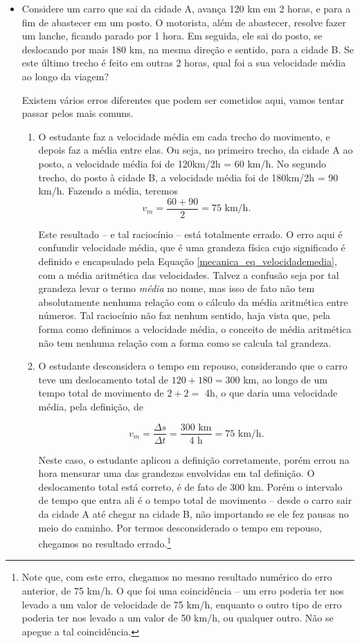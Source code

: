 \begin{itemize}
    O erro aqui, portanto, é considerar a distância, e não o deslocamento escalar, para o cálculo da velocidade média.

    \item [(ii)] Considere um carro que sai da cidade A, avança 120 km em 2 horas, e para a fim de abastecer em um posto. O motorista, além de abastecer, resolve fazer um lanche, ficando parado por 1 hora. Em seguida, ele sai do posto, se deslocando por mais 180 km, na mesma direção e sentido, para a cidade B. Se este último trecho é feito em outras 2 horas, qual foi a sua velocidade média ao longo da viagem?


    Existem vários erros diferentes que podem ser cometidos aqui, vamos tentar passar pelos mais comuns.

    \begin{enumerate}
        \item O estudante faz a velocidade média em cada trecho do movimento, e depois faz a média entre elas. Ou seja, no primeiro trecho, da cidade A ao posto, a velocidade média foi de 120km/2h = 60 km/h. No segundo trecho, do posto à cidade B, a velocidade média foi de 180km/2h = 90 km/h. Fazendo a média, teremos
        $$ v_m = \dfrac{60+90}{2} = 75 \text{ km/h.}$$

        Este resultado -- e tal raciocínio -- está totalmente errado. O erro aqui é confundir velocidade média, que é uma grandeza física cujo significado é definido e encapsulado pela Equação \eqref{mecanica_eq_velocidademedia}, com a média aritmética das velocidades. Talvez a confusão seja por tal grandeza levar o termo \textit{média} no nome, mas isso de fato não tem absolutamente nenhuma relação com o cálculo da média aritmética entre números. Tal raciocínio não faz nenhum sentido, haja vista que, pela forma como definimos a velocidade média, o conceito de média aritmética não tem nenhuma relação com a forma como se calcula tal grandeza.

        \item O estudante desconsidera o tempo em repouso, considerando que o carro teve um deslocamento total de $120+180 = 300 $ km, ao longo de um tempo total de movimento de $2+2 = $ 4h, o que daria uma velocidade média, pela definição, de 

        $$ v_m = \dfrac{\Delta s}{\Delta t} = \dfrac{300 \text{ km}}{4 \text{ h}} = 75 \text{ km/h}.$$

        Neste caso, o estudante aplicou a definição corretamente, porém errou na hora mensurar uma das grandezas envolvidas em tal definição. O deslocamento total está correto, é de fato de 300 km. Porém o intervalo de tempo que entra ali é o tempo total de movimento -- desde o carro sair da cidade A até chegar na cidade B, não importando se ele fez pausas no meio do caminho. Por termos desconsiderado o tempo em repouso, chegamos no resultado errado.\footnote{Note que, com este erro, chegamos no mesmo resultado numérico do erro anterior, de 75 km/h. O que foi uma coincidência -- um erro poderia ter nos levado a um valor de velocidade de 75 km/h, enquanto o outro tipo de erro poderia ter nos levado a um valor de 50 km/h, ou qualquer outro. Não se apegue a tal coincidência.}
    \end{enumerate}


\end{itemize}
